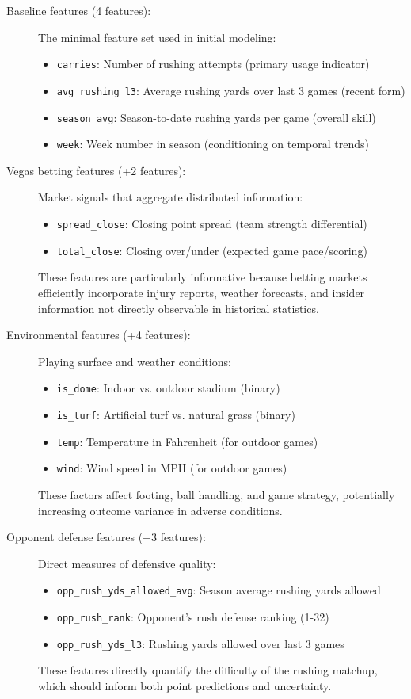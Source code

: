 \begin{description}
    \item[Baseline features (4 features):] The minimal feature set used in initial modeling:
    \begin{itemize}
        \item \texttt{carries}: Number of rushing attempts (primary usage indicator)
        \item \texttt{avg\_rushing\_l3}: Average rushing yards over last 3 games (recent form)
        \item \texttt{season\_avg}: Season-to-date rushing yards per game (overall skill)
        \item \texttt{week}: Week number in season (conditioning on temporal trends)
    \end{itemize}

    \item[Vegas betting features (+2 features):] Market signals that aggregate distributed information:
    \begin{itemize}
        \item \texttt{spread\_close}: Closing point spread (team strength differential)
        \item \texttt{total\_close}: Closing over/under (expected game pace/scoring)
    \end{itemize}
    These features are particularly informative because betting markets efficiently incorporate injury reports, weather forecasts, and insider information not directly observable in historical statistics.

    \item[Environmental features (+4 features):] Playing surface and weather conditions:
    \begin{itemize}
        \item \texttt{is\_dome}: Indoor vs. outdoor stadium (binary)
        \item \texttt{is\_turf}: Artificial turf vs. natural grass (binary)
        \item \texttt{temp}: Temperature in Fahrenheit (for outdoor games)
        \item \texttt{wind}: Wind speed in MPH (for outdoor games)
    \end{itemize}
    These factors affect footing, ball handling, and game strategy, potentially increasing outcome variance in adverse conditions.

    \item[Opponent defense features (+3 features):] Direct measures of defensive quality:
    \begin{itemize}
        \item \texttt{opp\_rush\_yds\_allowed\_avg}: Season average rushing yards allowed
        \item \texttt{opp\_rush\_rank}: Opponent's rush defense ranking (1-32)
        \item \texttt{opp\_rush\_yds\_l3}: Rushing yards allowed over last 3 games
    \end{itemize}
    These features directly quantify the difficulty of the rushing matchup, which should inform both point predictions and uncertainty.
\end{description}

